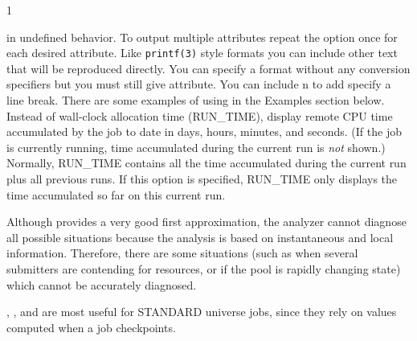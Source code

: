 \begin{ManPage}{\label{man-condor-q}}{1}
\begin{Options}
{		in undefined behavior.  To output multiple attributes
		repeat the  option once for each desired
		attribute.
		Like {\texttt{printf(3)}} style formats you can include other
		text that will be reproduced directly.   You can specify
		a format without any conversion specifiers but you must
		still give attribute.
		You can include \Bs n to add specify a line break.
		There are some examples of using  in the
		Examples section below.  }
	 {Instead of wall-clock allocation time (RUN\_TIME), 
		display remote CPU time accumulated by the job to date in days,
		hours, minutes, and seconds.  (If the job is currently running, time
		accumulated during the current run is \emph{not} shown.)}
	 {Normally, RUN\_TIME contains all the time
		accumulated during the current run plus all previous runs.  If this
		option is specified, RUN\_TIME only displays the time accumulated so
		far on this current run.}
\end{Options}

\GenRem
Although  provides a very good first approximation, the analyzer 
cannot diagnose all possible situations because the analysis is based on 
instantaneous and local information.  Therefore, there are some situations 
(such as when several submitters are contending for resources, or if the pool 
is rapidly changing state) which cannot be accurately diagnosed.

, , and  are most useful for STANDARD
universe jobs, since they rely on values computed when a job
checkpoints.

\Examples


\end{ManPage}
